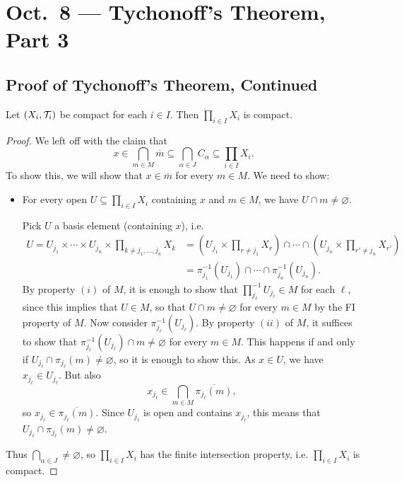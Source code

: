 \chapter{Oct.~8 --- Tychonoff's Theorem, Part 3}

\section{Proof of Tychonoff's Theorem, Continued}
\begin{theorem}[Tychonoff]
  Let $(X_i, \mathcal{T}_i)$ be compact for each $i \in I$.
  Then $\prod_{i \in I} X_i$ is compact.
\end{theorem}

\begin{proof}
  We left off with the claim that
  \[
    x \in \bigcap_{m \in M} \overline{m}
    \subseteq \bigcap_{\alpha \in J} C_\alpha
    \subseteq \prod_{i \in I} X_i.
  \]
  To show this,
  we will show that $x \in \overline{m}$ for every
  $m \in M$. We need to show:
  \begin{itemize}
    \item For every open $U \subseteq \prod_{i \in I} X_i$ containing $x$ and
      $m \in M$, we have $U \cap m \ne \varnothing$.

      Pick $U$ a basis element (containing $x$), i.e.
      \begin{align*}
        U = U_{j_1} \times \cdots \times U_{j_n} \times
        \prod_{k \ne j_1, \ldots, j_n} X_k
        &= \left(U_{j_1} \times \prod_{r \ne j_1} X_r\right)
        \cap \cdots \cap \left(U_{j_n} \times \prod_{r' \ne j_n} X_{r'}\right) \\
        &= \pi_{j_1}^{-1}(U_{j_1}) \cap \cdots \cap \pi_{j_n}^{-1}(U_{j_n}).
      \end{align*}
      By property $(i)$ of $M$, it is enough to show
      that $\prod_{j_\ell}^{-1} U_{j_\ell} \in M$ for
      each $\ell$,
      since this implies that $U \in M$, so that
      $U \cap m \ne \varnothing$ for every $m \in M$
      by the FI property of
      $M$. Now consider $\pi_{j_\ell}^{-1}(U_{j_\ell})$.
      By property $(ii)$ of $M$, it suffices to show
      that
      $\pi_{j_\ell}^{-1}(U_{j_\ell}) \cap m \ne \varnothing$
      for every $m \in M$. This happens if
      and only if $U_{j_\ell} \cap \pi_{j_\ell}(m) \ne \varnothing$, so it is enough to show this.
      As $x \in U$, we have $x_{j_\ell} \in U_{j_\ell}$.
      But also
      \[
        x_{j_\ell} \in \bigcap_{m \in M} \overline{\pi_{j_\ell}(m)},
      \]
      so $x_{j_\ell} \in \overline{\pi_{j_\ell}(m)}$.
      Since $U_{j_\ell}$ is open and contains $x_{j_\ell}$,
      this means that $U_{j_\ell} \cap \pi_{j_\ell}(m) \ne \varnothing$.
  \end{itemize}
  Thus $\bigcap_{\alpha \in J} \ne \varnothing$,
  so $\prod_{i \in I} X_i$ has the finite intersection
  property, i.e. $\prod_{i \in I} X_i$ is compact.
\end{proof}

